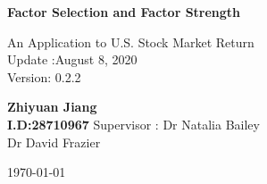 \begin{titlepage}
\begin{center}
\vspace*{1cm}
\Huge
\textbf{Factor Selection and Factor Strength}

\vspace{0.5cm}
\LARGE
An Application to U.S. Stock Market Return\\
\Large
Update :August 8, 2020 \\
Version: 0.2.2

\vspace{1.5 cm}
\textbf{Zhiyuan Jiang\\I.D:28710967}
\vfill
 Supervisor : Dr Natalia Bailey\\\hspace{30mm} Dr David Frazier
 \vspace{0.8cm}
 
\Large
\today
\end{center}
\end{titlepage}
